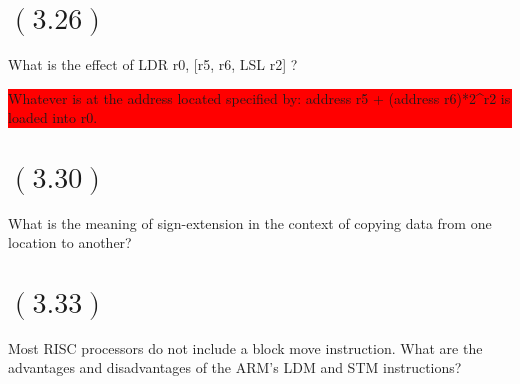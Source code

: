 \documentclass[letterpaper,12pt,titlepage]{article}
\begin{document}
\section*{$(3.26)$} What is the effect of LDR r0, [r5, r6, LSL r2] ?

\begin{mdframed}[style=MyFrame]
\colorbox{red}{
  
Whatever is at the address located specified by: address r5 + (address r6)*2^r2 is loaded into r0.


}
\end{mdframed}

\section*{$(3.30)$} What is the meaning of sign-extension in the context of copying data from one location to another?

\begin{mdframed}[style=MyFrame]
\end{mdframed}

\section*{$(3.33)$} Most RISC processors do not include a block move instruction. What are the advantages and disadvantages of the ARM's LDM and STM instructions?

\begin{mdframed}[style=MyFrame]
\end{mdframed}

\newpage
\end{document}
